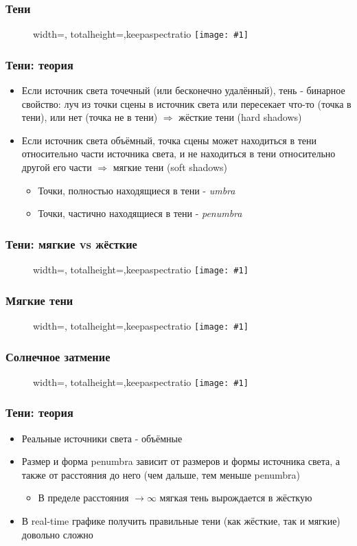 \documentclass{beamer}
\newcommand{\slideimage}[1]{
  \begin{figure}
    \begin{adjustbox}{width=\textwidth, totalheight=\textheight-2\baselineskip-2\baselineskip,keepaspectratio}
      \texttt{[image: \#1]}
    \end{adjustbox}
  \end{figure}
}
\begin{document}
\begin{frame}[fragile]
\frametitle{Тени}
\slideimage{shadows1.png}
\end{frame}

\begin{frame}[fragile]
\frametitle{Тени: теория}
\begin{itemize}
\item Если источник света точечный (или бесконечно удалённый), тень - бинарное свойство: луч из точки сцены в источник света или пересекает что-то (точка в тени), или нет (точка не в тени) \begin{math}\Rightarrow\end{math} жёсткие тени (hard shadows)
\pause
\item Если источник света объёмный, точка сцены может находиться в тени относительно части источника света, и не находиться в тени относительно другой его части \begin{math}\Rightarrow\end{math} мягкие тени (soft shadows)
\pause
\begin{itemize}
\item Точки, полностью находящиеся в тени - \textit{umbra}
\item Точки, частично находящиеся в тени - \textit{penumbra}
\end{itemize}
\end{itemize}
\end{frame}

\begin{frame}[fragile]
\frametitle{Тени: мягкие vs жёсткие}
\slideimage{shadow-scheme1.png}
\end{frame}

\begin{frame}[fragile]
\frametitle{Мягкие тени}
\slideimage{shadows2.png}
\end{frame}

\begin{frame}[fragile]
\frametitle{Солнечное затмение}
\slideimage{eclipse.png}
\end{frame}

\begin{frame}[fragile]
\frametitle{Тени: теория}
\begin{itemize}
\item Реальные источники света - объёмные
\pause
\item Размер и форма penumbra зависит от размеров и формы источника света, а также от расстояния до него (чем дальше, тем меньше penumbra)
\pause
\begin{itemize}
\item В пределе расстояния \begin{math}\rightarrow\infty\end{math} мягкая тень вырождается в жёсткую
\end{itemize}
\pause
\item В real-time графике получить правильные тени (как жёсткие, так и мягкие) довольно сложно
\end{itemize}
\end{frame}
\end{document}
